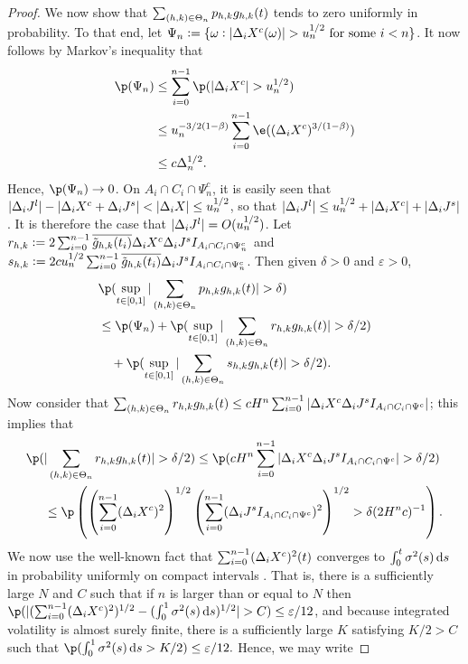 \begin{proof}
We now show that $\sum_{(h,k) \in \Theta_n} p_{h,k} g_{h,k} (t)$ tends to zero uniformly  in probability.
To that end, let $\Psi_n := \{\omega: \vert \Delta_i X^c(\omega) \vert > u_n^{1/2} \text{ for some } i < n\}$.  It now follows by Markov's inequality that 
\begin{align}
  \p(\Psi_n ) &\le \sumin \p(\vert \dxc \vert > u_n^{1/2}) \notag \\
  & \le u_n^{-3/2(1 - \beta) } \sumin \e( (\dxc)^{ 3/(1 - \beta)} ) \notag\\
  & \le  c \Delta_n^{1/2}.
  \label{}
\end{align}
Hence, $\p(\Psi_n ) \to 0$. On $A_i \cap C_i \cap \Psi_n^c$, it is easily seen that $\vert \Delta_i J^l \vert - \vert \Delta_i X^c + \Delta_i J^s \vert < \vert \Delta_i X \vert \le u_n^{1/2}$, so that $\vert \Delta_i J^l\vert \le u^{1/2}_n + \vert \Delta_i X^c \vert + \vert \Delta_i J^s\vert$. It is therefore the case that  $ \vert \Delta_i J^l \vert  = O(u^{1/2}_n)$. Let $r_{h,k} :=  2 \sum_{i = 0}^{n-1} \overline{\tilde{g}_{h,k}(t_i)}\Delta_i X^c \Delta_i J^s I_{A_i \cap C_i \cap \Psi_n^c}$ and $s_{h,k} := 2 c u_n^{1/2}\sum_{i = 0}^{n-1} \overline{\tilde{g}_{h,k}(t_i)} \Delta_i J^s I_{A_i \cap C_i \cap \Psi_n^c}$. Then given  $\delta > 0$ and $\varepsilon > 0$, 
\begin{align}
  &\p(\sup_{t \in \domain}\vert\sumt p_{h,k} \ghk(t) \vert > \delta)\notag \\&  \le \p(\Psi_n) + \p(\sup_{t \in \domain} \vert\sumt r_{h,k} \ghk(t) \vert > \delta/2)  \notag \\
  &\quad + \p(\sup_{t \in \domain} \vert\sumt s_{h,k} \ghk(t) \vert > \delta/2).
  \label{eq:phk}
\end{align}
Now consider that $\sum_{(h,k) \in \Theta_n} r_{h,k} g_{h,k}(t) \le  c H^n \sum_{i = 0}^{n-1} \vert \Delta_i X^c \Delta_i J^s  I_{A_i \cap C_i \cap \Psi^c} \vert$; this implies that  
\begin{align}
  \p(&\vert\sumt r_{h,k} \ghk(t) \vert > \delta/2) \le \p(c H^n  \sumin \vert \dxc \djt I_{A_i \cap C_i \cap \Psi^c} \vert  > \delta/2)\notag\\& \le \p\left( \left(\sumin (\dxc)^2\right)^{1/2} \left(\sumin ( \djt I_{A_i \cap C_i \cap \Psi^c})^2\right)^{1/2} > \delta (2H^nc)^{-1}\right).\notag
  \label{}
\end{align}
We now use the well-known fact  that  $\sum_{i = 0}^{n-1} (\Delta_i X^c)^2 (t)$ converges to $\int_0^t\sigma^2(s)\D s$ in probability uniformly on compact intervals \citep[Theorem II.22]{Protter2004}. That is, there is a sufficiently large $N$   and $C$ such that if $n$ is larger than or equal to $N$ then   $ \p(\vert (\sumin (\dxc)^2)^{1/2}  - (\int_0^1\sigma^2(s) \D s)^{1/2}\vert > C ) \le  \varepsilon/12$, and because integrated volatility is almost surely finite, there is a sufficiently large $K$ satisfying  $K/2 > C$ such that $\p( \int_0^1\sigma^2(s) \D s > K/2) \le \varepsilon/12.$ Hence, we may write

\end{proof}
